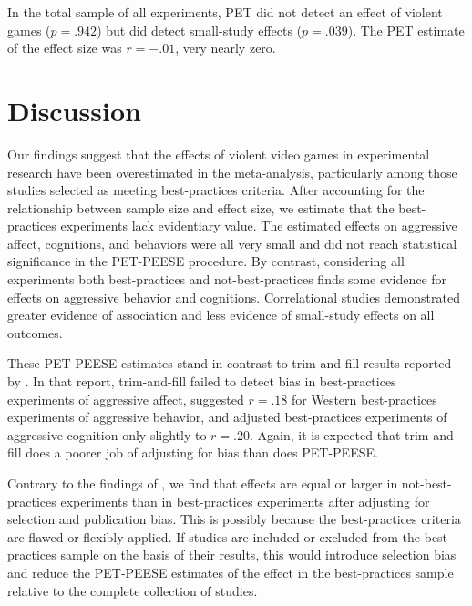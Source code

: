 \documentclass[man]{apa6}
\begin{document}
In the total sample of all experiments, PET did not detect an effect of violent games ($p = .942$) but did detect small-study effects ($p = .039$). The PET estimate of the effect size was $r = -.01$, very nearly zero.


\section{Discussion}
Our findings suggest that the effects of violent video games in experimental research have been overestimated in the \citet{Anderson:etal:2010} meta-analysis, particularly among those studies selected as meeting best-practices criteria. After accounting for the relationship between sample size and effect size, we estimate that the best-practices experiments lack evidentiary value. The estimated effects on aggressive affect, cognitions, and behaviors were all very small and did not reach statistical significance in the PET-PEESE procedure. By contrast, considering all experiments both best-practices and not-best-practices finds some evidence for effects on aggressive behavior and cognitions. Correlational studies demonstrated greater evidence of association and less evidence of small-study effects on all outcomes.

These PET-PEESE estimates stand in contrast to trim-and-fill results reported by \citet{Anderson:etal:2010}. In that report, trim-and-fill failed to detect bias in best-practices experiments of aggressive affect, suggested $r = .18$ for Western best-practices experiments of aggressive behavior, and adjusted best-practices experiments of aggressive cognition only slightly to $r = .20$. Again, it is expected that trim-and-fill does a poorer job of adjusting for bias than does PET-PEESE. %

Contrary to the findings of \citet{Anderson:etal:2010}, we find that effects are equal or larger in not-best-practices experiments than in best-practices experiments after adjusting for selection and publication bias. This is possibly because the best-practices criteria are flawed or flexibly applied. If studies are included or excluded from the best-practices sample on the basis of their results, this would introduce selection bias and reduce the PET-PEESE estimates of the effect in the best-practices sample relative to the complete collection of studies.
\end{document}
